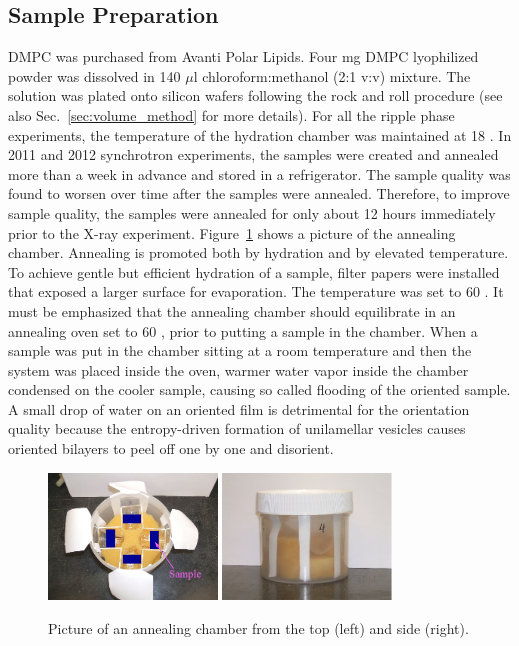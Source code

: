 \subsection{Sample Preparation}\label{sec:ripple_sample_prep}
DMPC was purchased from Avanti Polar Lipids.
Four mg DMPC lyophilized powder was dissolved in 140 $\mu$l 
chloroform:methanol (2:1 v:v) 
mixture. The solution was plated onto silicon wafers following the rock and
roll procedure \cite{Tristram-Nagle07_MMB}
(see also Sec.~\ref{sec:volume_method} for more details).
For all the ripple phase experiments, the temperature of the hydration 
chamber was maintained at 18 \textcelsius. 
In 2011 and 2012 synchrotron experiments, the samples were created and annealed 
more than a week in advance and stored in a refrigerator. The sample quality 
was found to worsen over time
after the samples were annealed. Therefore, to improve sample quality, the 
samples were annealed for only about 12 hours immediately prior to the X-ray experiment.
Figure~\ref{fig:annealing_chamber} shows a picture of the annealing chamber.
Annealing is promoted both by hydration and by elevated temperature. 
To achieve gentle but efficient hydration of a sample, filter papers were installed
that exposed a larger surface for evaporation. The temperature was set to
60 \textcelsius.
It must be emphasized that the annealing 
chamber should equilibrate in an annealing oven set to 60 \textcelsius,
prior to putting a sample in the chamber.
When a sample was put in the chamber sitting at a room temperature and
then the system was placed inside the oven, warmer water vapor inside the chamber 
condensed on the cooler sample, causing so called flooding of the oriented sample. 
A small drop of water on an oriented film is detrimental for the orientation quality because the
entropy-driven formation of unilamellar vesicles causes oriented bilayers to 
peel off one by one and disorient. 

\begin{figure}[htbp]
  \centering
  \includegraphics[width=0.4\textwidth]{figures/ripple/MMs/annealing_chamber_topview}
  \quad
  \includegraphics[width=0.4\textwidth]{figures/ripple/MMs/annealing_chamber_sideview}  
  \caption[Pictures of an annealing chamber]{Picture of an annealing chamber
  from the top (left) and side (right).}
  \label{fig:annealing_chamber}
\end{figure}

